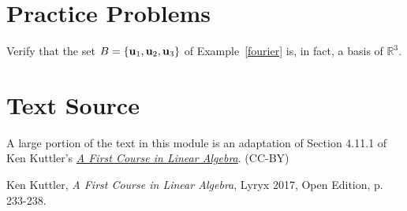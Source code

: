 \documentclass{ximera}
\begin{document}
\section*{Practice Problems}
\begin{problem}\label{prob:diagonalizematrix1}
Verify that the set $B=\{ {\bf u}_1, {\bf u}_2, {\bf u}_3\}$
of Example~\ref{fourier} is, in fact, a basis of $\mathbb{R}^3$.

\end{problem}
  
\section*{Text Source}
A large portion of the text in this module is an adaptation of Section 4.11.1 of Ken Kuttler's \href{https://open.umn.edu/opentextbooks/textbooks/a-first-course-in-linear-algebra-2017}{\it A First Course in Linear Algebra}. (CC-BY)

Ken Kuttler, {\it  A First Course in Linear Algebra}, Lyryx 2017, Open Edition, p. 233-238.  
\end{document}
